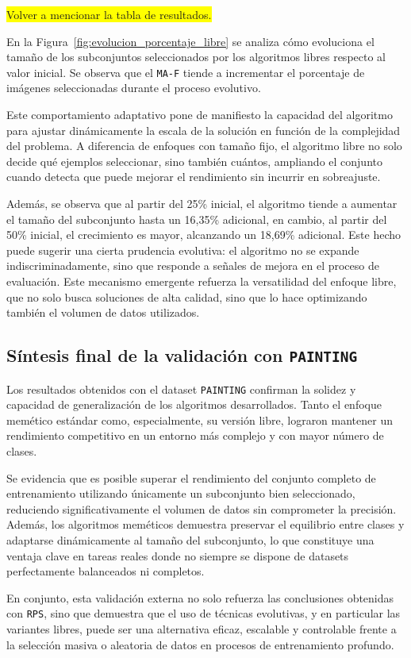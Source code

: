 \colorbox{yellow}{Volver a mencionar la tabla de resultados.}

En la Figura~\ref{fig:evolucion_porcentaje_libre} se analiza cómo evoluciona el tamaño de los subconjuntos seleccionados por los algoritmos libres respecto al valor inicial.
Se observa que el \texttt{MA-F} tiende a incrementar el porcentaje de imágenes seleccionadas durante el proceso evolutivo.

Este comportamiento adaptativo pone de manifiesto la capacidad del algoritmo para ajustar dinámicamente la escala de la solución en función de la complejidad del problema.
A diferencia de enfoques con tamaño fijo, el algoritmo libre no solo decide qué ejemplos seleccionar, sino también cuántos,
ampliando el conjunto cuando detecta que puede mejorar el rendimiento sin incurrir en sobreajuste.

Además, se observa que al partir del 25\% inicial, el algoritmo tiende a aumentar el tamaño del subconjunto hasta un 16,35\% adicional,
en cambio, al partir del 50\% inicial, el crecimiento es mayor, alcanzando un 18,69\% adicional.
Este hecho puede sugerir una cierta prudencia evolutiva: el algoritmo no se expande indiscriminadamente,
sino que responde a señales de mejora en el proceso de evaluación.
Este mecanismo emergente refuerza la versatilidad del enfoque libre, que no solo busca soluciones de alta calidad,
sino que lo hace optimizando también el volumen de datos utilizados.


\bigskip

\subsection*{Síntesis final de la validación con \texttt{PAINTING}}
Los resultados obtenidos con el dataset \texttt{PAINTING} confirman la solidez y capacidad de generalización de los algoritmos desarrollados.
Tanto el enfoque memético estándar como, especialmente, su versión libre, lograron mantener un rendimiento competitivo en un entorno más complejo y con mayor número de clases.

Se evidencia que es posible superar el rendimiento del conjunto completo de entrenamiento utilizando únicamente un subconjunto bien seleccionado,
reduciendo significativamente el volumen de datos sin comprometer la precisión.
Además, los algoritmos meméticos demuestra preservar el equilibrio entre clases y adaptarse dinámicamente al tamaño del subconjunto,
lo que constituye una ventaja clave en tareas reales donde no siempre se dispone de datasets perfectamente balanceados ni completos.

En conjunto, esta validación externa no solo refuerza las conclusiones obtenidas con \texttt{RPS},
sino que demuestra que el uso de técnicas evolutivas, y en particular las variantes libres, puede ser una alternativa eficaz,
escalable y controlable frente a la selección masiva o aleatoria de datos en procesos de entrenamiento profundo.
